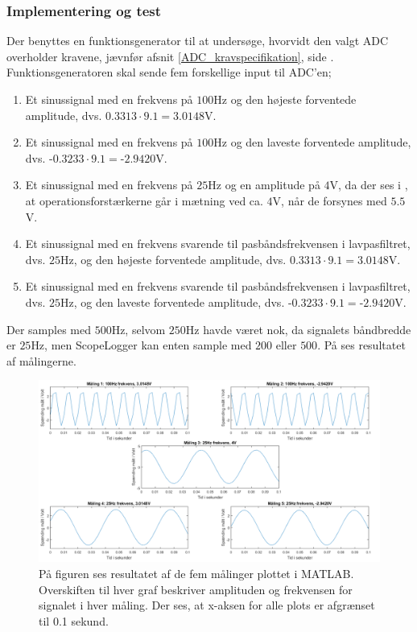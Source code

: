 \subsubsection{Implementering og test}
Der benyttes en funktionsgenerator til at undersøge, hvorvidt den valgt ADC overholder kravene, jævnfør afsnit \ref{ADC_kravspecifikation}, side \pageref{ADC_kravspecifikation}. Funktionsgeneratoren skal sende fem forskellige input til ADC'en;
\begin{enumerate}
	\item Et sinussignal med en frekvens på $100$Hz og den højeste forventede amplitude, dvs. $0.3313 \cdot 9.1 = 3.0148$V.
	\item Et sinussignal med en frekvens på $100$Hz og den laveste forventede amplitude, dvs. -$0.3233 \cdot 9.1 = $-$2.9420$V.
	\item Et sinussignal med en frekvens på $25$Hz og en amplitude på $4$V, da der ses i , at operationsforstærkerne går i mætning ved ca. $4$V, når de forsynes med $5.5$V. 
	\item Et sinussignal med en frekvens svarende til pasbåndsfrekvensen i lavpasfiltret, dvs. $25$Hz, og den højeste forventede amplitude, dvs. $0.3313 \cdot 9.1 = 3.0148$V.
	\item Et sinussignal med en frekvens svarende til pasbåndsfrekvensen i lavpasfiltret, dvs. $25$Hz, og den laveste forventede amplitude, dvs. -$0.3233 \cdot 9.1 = $-$2.9420$V.
\end{enumerate}
\noindent Der samples med $500$Hz, selvom $250$Hz havde været nok, da signalets båndbredde er $25$Hz, men ScopeLogger kan enten sample med $200$ eller $500$. På  ses resultatet af målingerne.

\begin{figure}[H]
	\centering
	\includegraphics[scale=0.45]{figures/cProblemloesning/ADC_Test3_matlab.PNG}
	\caption{På figuren ses resultatet af de fem målinger plottet i MATLAB. Overskiften til hver graf beskriver amplituden og frekvensen for signalet i hver måling. Der ses, at x-aksen for alle plots er afgrænset til 0.1 sekund.}
	\label{fig:ADC_Test}
\end{figure}

